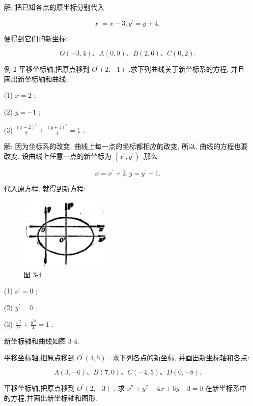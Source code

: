 \documentclass[lang=cn,newtx,10pt,scheme=chinese]{elegantbook}
\begin{document}
解: 把已知各点的原坐标分别代入

\[
    {x}^{\prime } = x - 3,{y}^{\prime } = y + 4,
\]

便得到它们的新坐标:

\[
  O\left( {-3,4}\right) \text{、}A\left( {0,0}\right) \text{、}B\left( {2,6}\right) \text{、}C\left( {0,2}\right) \text{.}
\]

例 2 平移坐标轴,把原点移到 \({O}^{\prime }\left( {2, - 1}\right)\) ,求下列曲线关于新坐标系的方程, 并且画出新坐标轴和曲线:

(1) \(x = 2\) ;

(2) \(y = - 1\) ;

(3) \(\frac{{\left( x - 2\right) }^{2}}{9} + \frac{{\left( y + 1\right) }^{2}}{4} = 1\) .

解: 因为坐标系的改变, 曲线上每一点的坐标都相应的改变, 所以, 曲线的方程也要改变. 设曲线上任意一点的新坐标为 \(\left( {{x}^{\prime },{y}^{\prime }}\right)\) ,那么

\[
  x = {x}^{\prime } + 2,y = {y}^{\prime } - 1.
\]

代入原方程, 就得到新方程:

\begin{figure}[h]
  \centering
  \includegraphics[max width=0.4\textwidth]{images/01912cc2-ffb6-728e-9ae7-b113ff05c64b_135_995645.jpg}
  \caption{图 3-4}
\end{figure}



(1) \({x}^{\prime } = 0\) ;

(2) \({y}^{\prime } = 0\) ;

(3) \(\frac{{x}^{\prime 2}}{9} + \frac{{y}^{\prime 2}}{4} = 1\) .

新坐标轴和曲线如图 3-4.

\begin{problemset}[练习]

\item 平移坐标轴,把原点移到 \({O}^{\prime }\left( {4,5}\right)\) . 求下列各点的新坐标, 并画出新坐标轴和各点:

\[
  A\left( {3, - 6}\right) \text{、}B\left( {7,0}\right) \text{、}C\left( {-4,5}\right) \text{、}D\left( {0, - 8}\right) .
\]

\item 平移坐标轴,把原点移到 \({O}^{\prime }\left( {2, - 3}\right)\) . 求 \({x}^{2} + {y}^{2} - {4x} + {6y}\) \(- 3 = 0\) 在新坐标系中的方程,并画出新坐标轴和图形.

\end{problemset}
\end{document}
